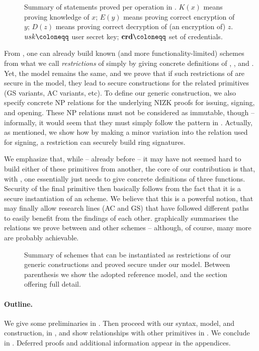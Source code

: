 \begin{figure}[ht!]
  \centering
  \scalebox{0.9}{
    
  }
  \caption{Summary of statements proved per operation in \UAS.
    $K(x)$ means proving knowledge of $x$; $E(y)$ means proving correct
    encryption of $y$; $D(z)$ means proving correct decryption of (an encryption
    of) $z$. $\usk \coloneqq$ user secret key; $\scred \coloneqq$ set of
    credentials.}
  \label{fig:proof-blocks-uas}
\end{figure}

From \CUASGen, one can already build known (and more functionality-limited)
schemes from what we call \emph{restrictions} of \CUASGen simply by giving
concrete definitions of \fissue, \feval, and \finsp. Yet, the model remains the
same, and we prove that if such restrictions of \CUASGen are secure in the \UAS
model, they lead to secure constructions for the related primitives (GS
variants, AC variants, etc). To define our generic construction, we also specify
concrete NP relations for the underlying NIZK proofs for issuing, signing, and
opening. These NP relations must not be considered as immutable, though --
informally, it would seem that they must simply follow the pattern in
. Actually, as mentioned, we show how by making a
minor variation into the relation used for signing, a \CUASGen restriction can
securely build ring signatures.

We emphasize that, while -- already before \UAS -- it may have not seemed hard
to build either of these primitives from another, the core of our contribution
is that, with \UAS, one essentially just needs to give concrete definitions of
three functions. Security of the final primitive then basically follows from
the fact that it is a secure instantiation of an \UAS scheme. We believe that
this is a powerful notion, that may finally allow research lines (AC and GS)
that have followed different paths to easily benefit from the findings of each
other.  graphically summarises the relations we prove
between \UAS and other schemes -- although, of course, many more are probably
achievable.

\begin{figure}[ht!]
  \centering
  \scalebox{0.9}{
    
  }
  \caption{Summary of schemes that can be instantiated as restrictions of our
    generic constructions and proved secure under our \UAS model. Between
    parenthesis we show the adopted reference model, and the section offering
    full detail.}
  \label{fig:relations}
\end{figure}

\paragraph{Outline.} %
We give some preliminaries in . Then proceed with our
\UAS syntax, model, and construction, in , and show
relationships with other primitives in . We conclude
in . Deferred proofs and additional information appear
in the appendices.

